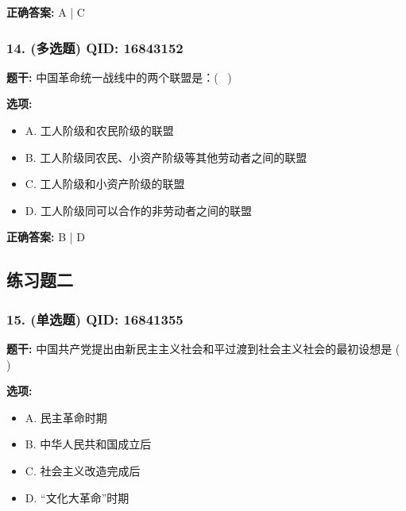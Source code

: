 \documentclass[12pt,UTF8]{ctexart}
\begin{document}
\textbf{正确答案:}
A | C

\vspace{0.3em}\hrulefill\vspace{0.7em}

\subsubsection*{14. (多选题) \small QID: 16843152}

\textbf{题干:}
中国革命统一战线中的两个联盟是：(  )

\textbf{选项:}
\begin{itemize}[leftmargin=*]

  \item A. 工人阶级和农民阶级的联盟

  \item B. 工人阶级同农民、小资产阶级等其他劳动者之间的联盟

  \item C. 工人阶级和小资产阶级的联盟

  \item D. 工人阶级同可以合作的非劳动者之间的联盟

\end{itemize}

\textbf{正确答案:}
B | D

\vspace{0.3em}\hrulefill\vspace{0.7em}

\subsection*{练习题二}

\subsubsection*{15. (单选题) \small QID: 16841355}

\textbf{题干:}
中国共产党提出由新民主主义社会和平过渡到社会主义社会的最初设想是 ( )

\textbf{选项:}
\begin{itemize}[leftmargin=*]

  \item A. 民主革命时期

  \item B. 中华人民共和国成立后

  \item C. 社会主义改造完成后

  \item D. “文化大革命”时期

\end{itemize}
\end{document}
